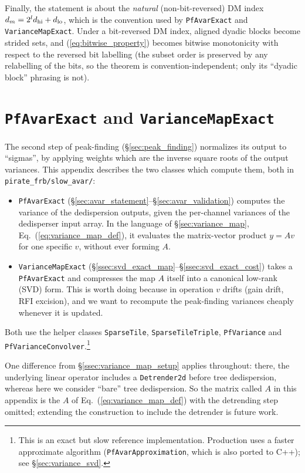 \documentclass{article}
\numberwithin{equation}{section}   %
\begin{document}
Finally, the statement is about the {\em natural} (non-bit-reversed) DM index
$d_m = 2^l d_{\rm hi} + d_{\rm lo}$, which is the convention used by {\tt PfAvarExact} and
{\tt VarianceMapExact}. Under a bit-reversed DM index, aligned dyadic blocks become strided
sets, and (\ref{eq:bitwise_property}) becomes bitwise monotonicity with respect to the
reversed bit labelling (the subset order is preserved by any relabelling of the bits, so the
theorem is convention-independent; only its ``dyadic block'' phrasing is not).

\clearpage

\section{{\tt PfAvarExact} and {\tt VarianceMapExact}}
\label{sec:analytic_variance}

The second step of peak-finding (\S\ref{sec:peak_finding}) normalizes its output to ``sigmas'',
by applying weights which are the inverse square roots of the output variances.
This appendix describes the two classes which compute them, both in
\verb|pirate_frb/slow_avar/|:
\begin{itemize}
\item \verb|PfAvarExact| (\S\ref{sec:avar_statement}--\S\ref{sec:avar_validation}) computes the
variance of the dedispersion outputs, given the per-channel variances of the dedisperser input
array. In the language of \S\ref{sec:variance_map}, Eq.\ (\ref{eq:variance_map_def}), it
evaluates the matrix-vector product $y = Av$ for one specific $v$, without ever forming $A$.
\item \verb|VarianceMapExact| (\S\ref{ssec:svd_exact_map}--\S\ref{ssec:svd_exact_cost}) takes a
\verb|PfAvarExact| and compresses the map $A$ itself into a canonical low-rank (SVD) form. This
is worth doing because in operation $v$ drifts (gain drift, RFI excision), and we want to
recompute the peak-finding variances cheaply whenever it is updated.
\end{itemize}
Both use the helper classes \verb|SparseTile|, \verb|SparseTileTriple|, \verb|PfVariance| and
\verb|PfVarianceConvolver|.\footnote{This is an exact but slow reference
implementation. Production uses a faster approximate algorithm ({\tt PfAvarApproximation},
which is also ported to C++); see \S\ref{sec:variance_svd}.}

One difference from \S\ref{ssec:variance_map_setup} applies throughout: there, the underlying
linear operator includes a {\tt Detrender2d} before tree dedispersion, whereas here we consider
``bare'' tree dedispersion. So the matrix called $A$ in this appendix is the $A$ of
Eq.\ (\ref{eq:variance_map_def}) with the detrending step omitted; extending the construction to
include the detrender is future work.
\end{document}
